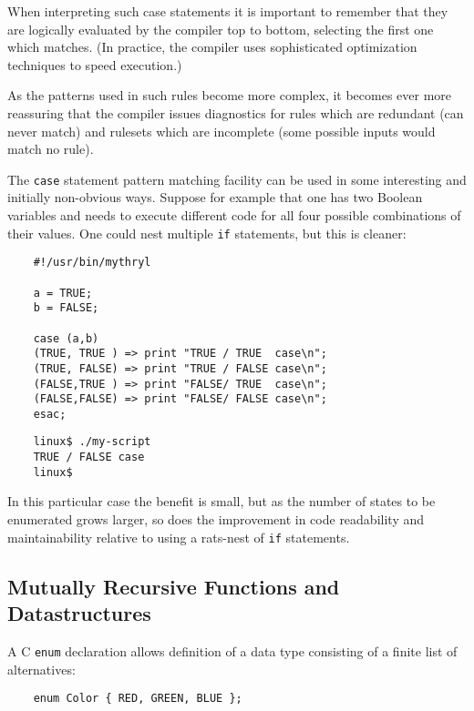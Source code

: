 When interpreting such case statements it is important to remember 
that they are logically evaluated by the compiler top to bottom, 
selecting the first one which matches.  (In practice, the compiler 
uses sophisticated optimization techniques to speed execution.) 

As the patterns used in such rules become more complex, it becomes 
ever more reassuring that the compiler issues diagnostics for rules 
which are redundant (can never match) and rulesets which are 
incomplete (some possible inputs would match no rule).

The {\tt case} statement pattern matching facility can be used in 
some interesting and initially non-obvious ways.  Suppose for 
example that one has two Boolean variables and needs to execute 
different code for all four possible combinations of their values. 
One could nest multiple {\tt if} statements, but this is cleaner:

\begin{verbatim}
    #!/usr/bin/mythryl

    a = TRUE;
    b = FALSE;

    case (a,b)
    (TRUE, TRUE ) => print "TRUE / TRUE  case\n";
    (TRUE, FALSE) => print "TRUE / FALSE case\n";
    (FALSE,TRUE ) => print "FALSE/ TRUE  case\n";
    (FALSE,FALSE) => print "FALSE/ FALSE case\n";
    esac;
\end{verbatim}

\begin{verbatim}
    linux$ ./my-script
    TRUE / FALSE case
    linux$ 
\end{verbatim}

In this particular case the benefit is small, but as the 
number of states to be enumerated grows larger, so does 
the improvement in code readability and maintainability 
relative to using a rats-nest of {\tt if} statements.


\cutend*

\subsection{Mutually Recursive Functions and Datastructures}

A C {\tt enum} declaration allows definition of a data type consisting 
of a finite list of alternatives:

\begin{verbatim}
    enum Color { RED, GREEN, BLUE };
\end{verbatim}

